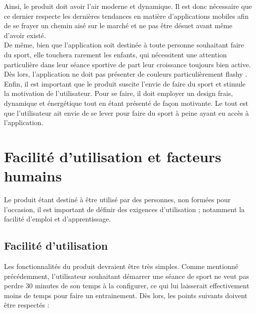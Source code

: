 Ainsi, le produit doit avoir l'air moderne et dynamique. Il est donc nécessaire que ce dernier respecte les dernières tendances en matière d'applications mobiles afin de se frayer un chemin aisé sur le marché et ne pas être désuet avant même d'avoir existé.\\

De même, bien que l'application soit destinée à toute personne souhaitant faire du sport, elle touchera rarement les enfants, qui nécessitent une attention particulière dans leur séance sportive de part leur croissance toujours bien active. Dès lors, l'application ne doit pas présenter de couleurs particulièrement \og flashy \fg{}.\\

Enfin, il est important que le produit suscite l'envie de faire du sport et stimule la motivation de l'utilisateur. Pour se faire, il doit employer un design frais, dynamique et énergétique tout en étant présenté de façon motivante. Le tout est que l'utilisateur ait envie de se lever pour faire du sport à peine ayant eu accès à l'application.

\section{Facilité d'utilisation et facteurs humains}
Le produit étant destiné à être utilisé par des personnes, non formées pour l'occasion, il est important de définir des exigences d'utilisation ; notamment la facilité d'emploi et d'apprentissage.

\subsection*{Facilité d'utilisation}
Les fonctionnalités du produit devraient être très simples. Comme mentionné précédemment, l'utilisateur souhaitant démarrer une séance de sport ne veut pas perdre 30 minutes de son temps à la configurer, ce qui lui laisserait effectivement moins de temps pour faire un entrainement. Dès lors, les points suivants doivent être respectés :\\

